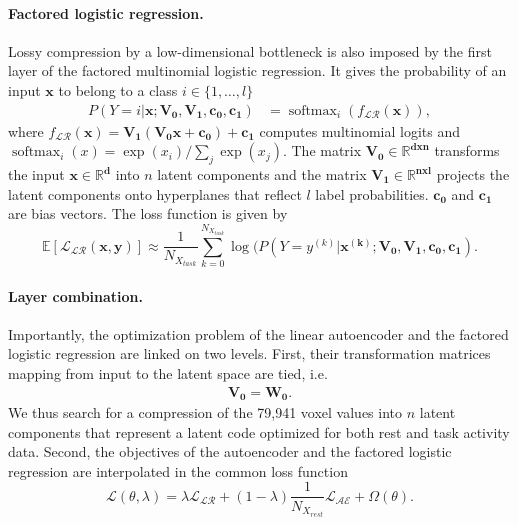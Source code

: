 \documentclass{article} %
\DeclareMathOperator{\softmax}{softmax}
\begin{document}
\paragraph{Factored logistic regression.}
Lossy compression by a low-dimensional bottleneck
is also imposed by the first layer of the factored
multinomial logistic regression.
It gives the probability of an input $\mathbf{x}$ to belong
to a class $i \in \{1, \dots, l\}$
\begin{equation}
  \begin{split}
    P(Y=i|\mathbf{x; V_0,V_1,c_0, c_1}) &= \softmax_i(f_\mathcal{LR}(\mathbf x)),
  \end{split}
  \label{eq:lr}
\end{equation}
where \(f_\mathcal{LR}(\mathbf x) = \mathbf{V_1 (V_0 x + c_0) + c_1}\) computes 
multinomial logits and \(\softmax_i(x) = \exp(x_i)/\sum_j\exp(x_j)\).
The matrix $\mathbf{V_0 \in \mathbb{R}^{dxn}}$
transforms the input $\mathbf{x \in \mathbb{R}^{d}}$
into $n$ latent components
and the matrix $\mathbf{V_1 \in \mathbb{R}^{nxl}}$
projects the latent components
onto hyperplanes that reflect $l$ label probabilities.
$\mathbf{c_0}$ and $\mathbf{c_1}$ are
bias vectors.
The loss function is given by
\begin{equation}
    \mathbb E\left[{\mathcal{L_{LR}}}(\mathbf{x, y})\right] \approx %
\frac{1}{N_{X_{task}}} \sum_{k=0}^{N_{X_{task}}} \log(P(Y=y^{(k)}|\mathbf{x^{(k)}; V_0, V_1, c_0, c_1}).
\label{eq:lr_loss}
\end{equation}

\paragraph{Layer combination.}
Importantly, the optimization problem of the linear autoencoder
and the factored logistic regression
are linked on two levels. First, their transformation matrices mapping from
input to the latent space are tied, i.e.
\begin{eqnarray}
  \mathbf{V_0} = \mathbf{W_0}.
\end{eqnarray}
We thus search for a compression of the 79,941 voxel values into $n$ latent
components that represent a latent code optimized for both
rest and task activity data.
Second, the objectives of the autoencoder and the factored
logistic regression are interpolated in the common loss function
\begin{equation}
{\mathcal{L}}(\theta, \lambda) = \lambda {\mathcal{L_{LR}}}
+ (1-\lambda)\frac{1}{N_{X_{rest}}} {\mathcal{L_{AE}}} + \Omega(\theta).
  \label{eq:loss_equ}
\end{equation}
\end{document}
